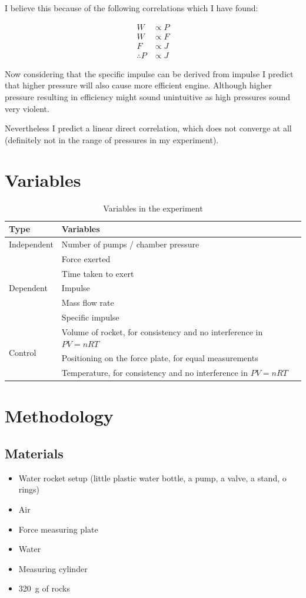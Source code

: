 \documentclass[12pt,a4paper]{article}
\begin{document}
I believe this because of the following correlations which I have found:

\begin{align}
W &\propto P \\
W &\propto F \\
F &\propto J \\
\therefore P &\propto J
\end{align}

Now considering that the specific impulse can be derived from impulse I predict that higher pressure will also cause more efficient engine. Although higher pressure resulting in efficiency might sound unintuitive as high pressures sound very violent.

Nevertheless I predict a linear direct correlation, which does not converge at all (definitely not in the range of pressures in my experiment).

\section{Variables}

\begin{table}[H]
\centering
\caption{Variables in the experiment}
\begin{tabular}{@{}lp{10cm}@{}}
\toprule
\textbf{Type} & \textbf{Variables} \\
\midrule
Independent & Number of pumps / chamber pressure \\
\midrule
\multirow{5}{*}{Dependent} & Force exerted \\
& Time taken to exert \\
& Impulse \\
& Mass flow rate \\
& Specific impulse \\
\midrule
\multirow{3}{*}{Control} & Volume of rocket, for consistency and no interference in $PV=nRT$ \\
& Positioning on the force plate, for equal measurements \\
& Temperature, for consistency and no interference in $PV=nRT$ \\
\bottomrule
\end{tabular}
\end{table}

\section{Methodology}

\subsection{Materials}
\begin{itemize}
\item Water rocket setup (little plastic water bottle, a pump, a valve, a stand, o rings)
\item Air
\item Force measuring plate
\item Water
\item Measuring cylinder
\item \SI{320}{\gram} of rocks
\end{itemize}
\end{document}
